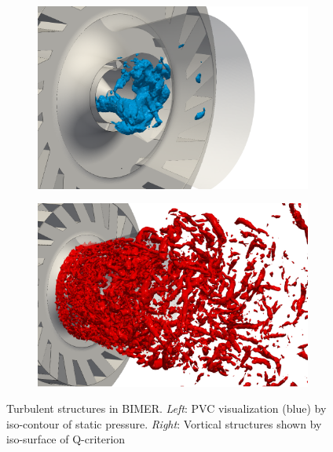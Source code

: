 \begin{figure}[ht]
\centering
\begin{subfigure}[b]{0.4\textwidth}
	\centering
   \includegraphics[scale=0.35]{./part3_applications/figures_ch7_aero/BIMER_application_PVC/PVC_P_m3000}
   \label{fig:BIMER_application_PVC}
\end{subfigure}
\hspace{0.8in}
\begin{subfigure}[b]{0.4\textwidth}
\centering
   \includegraphics[scale=0.35]{./part3_applications/figures_ch7_aero/BIMER_application_PVC/Q_crit_2e8}
   \label{fig:BIMER_application_Qcrit}
\end{subfigure}
\caption[Turbulent structures in BIMER]{Turbulent structures in BIMER. \textsl{Left}: PVC visualization (blue) by iso-contour of static pressure. \textsl{Right}: Vortical structures shown by iso-surface of Q-criterion}
\label{fig:BIMER_application_turbulent_structures}
\end{figure}






